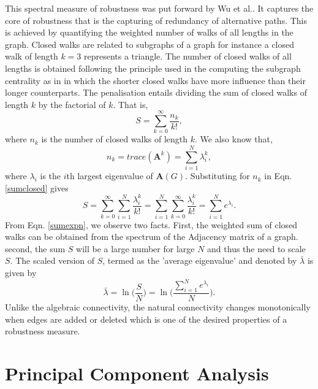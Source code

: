 \documentclass[10pt,a4paper]{article}
\begin{document}
\begin{enumerate}
		This spectral measure of robustness was put forward by Wu et al.\citep{wu2564spectral}. It captures the core of robustness that is the capturing of redundancy of alternative paths. This is achieved by quantifying the weighted number of walks of all lengths in the graph. Closed walks are related to subgraphs of a graph for instance a closed walk of length $k=3$ represents a triangle. The number of closed walks of all lengths is obtained following the principle used in the computing the subgraph centrality as in \citep{estrada2011structure} in which the shorter closed walks have more influence than their longer counterparts. The penalisation entails dividing the sum of closed walks of length $k$ by the factorial of $k$. That is,  
		\begin{equation}
		S = \sum_{k=0}^{\infty} \frac{n_k}{k!},
		\label{sumclosed}
		\end{equation} 
		where $n_k$ is the number of closed walks of length $k$. We also know that,
		\begin{equation}
		n_k = trace(\mathbf{A}^k) = \sum_{i=1}^{N} \lambda_{i} ^k,
		\end{equation}
		where $\lambda_i$ is the $i$th largest eigenvalue of $\mathbf{A}(G)$.
		Substituting for $n_k$ in Eqn.\ref{sumclosed} gives
		\begin{equation}
		S = \sum_{k=0}^{\infty} \sum_{i=1}^{N} \frac{\lambda_{i} ^k} {k!} =  \sum_{i=1}^{N}\sum_{k=0}^{\infty} \frac{\lambda_{i} ^k} {k!}= \sum_{i=1}^{N} e^{\lambda_i}.
		\label{sumexpn}
		\end{equation}
		From Eqn. \ref{sumexpn}, we observe two facts. First, the weighted sum of closed walks can be obtained from the spectrum of the Adjacency matrix of a graph. second, the sum $S$ will be a large number for large $N$ and  thus the need to scale $S$. The scaled version of $S$, termed as the 'average eigenvalue' and denoted by $\bar{\lambda}$  is given by
		\begin{equation}
		\bar{\lambda} = \ln \big( \frac{S}{N}\big) = \ln \Big( \frac{\sum_{i=1}^{N} e^{\lambda_i}}{N} \Big).
		\end{equation}
		Unlike the algebraic connectivity, the natural connectivity changes monotonically when edges are added or deleted which is one of the desired properties of a robustness measure.
	\end{enumerate}
	\section{Principal Component Analysis}
	
\end{document}
